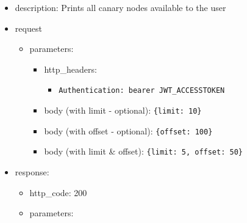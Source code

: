\documentclass[
]{article}
\begin{document}
\begin{itemize}
\item
  description: Prints all canary nodes available to the user
\item
  request

  \begin{itemize}
  \item
    parameters:

    \begin{itemize}
    \item
      http\_headers:

      \begin{itemize}
      \item
        \texttt{Authentication:\ \textquotesingle{}bearer\ JWT\_ACCESSTOKEN\textquotesingle{}}
      \end{itemize}
    \item
      body (with limit - optional):
      \texttt{\{\textquotesingle{}limit\textquotesingle{}:\ 10\}}
    \item
      body (with offset - optional):
      \texttt{\{\textquotesingle{}offset\textquotesingle{}:\ 100\}}
    \item
      body (with limit \& offset):
      \texttt{\{\textquotesingle{}limit\textquotesingle{}:\ 5,\ \textquotesingle{}offset\textquotesingle{}:\ 50\}}
    \end{itemize}
  \end{itemize}
\item
  response:

  \begin{itemize}
  \item
    http\_code: 200
  \item
    parameters:


\end{itemize}
\end{itemize}
\end{document}
